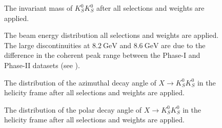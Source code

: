 \begin{figure}
  \begin{center}
    
  \end{center}
  \caption{The invariant mass of $K_S^0K_S^0$ after all selections and weights are applied.}\label{fig:meson-mass-data-pz-masscut-chisqdof-3.0-mesons-free-2}
\end{figure}
\begin{figure}
  \begin{center}
    
  \end{center}
  \caption{The beam energy distribution all selections and weights are applied. The large discontinuities at $\SI{8.2}{\giga\electronvolt}$ and $\SI{8.6}{\giga\electronvolt}$ are due to the difference in the coherent peak range between the Phase-I and Phase-II datasets (see ).}\label{fig:beam-energy-data-pz-masscut-chisqdof-3.0-mesons-free-2}
\end{figure}
\begin{figure}
  \begin{center}
    
  \end{center}
  \caption{The distribution of the azimuthal decay angle of $X \to K_S^0K_S^0$ in the helicity frame after all selections and weights are applied.}\label{fig:costheta-hx-v-meson-mass-data-pz-masscut-chisqdof-3.0-mesons-free-2}
\end{figure}
\begin{figure}
  \begin{center}
    
  \end{center}
  \caption{The distribution of the polar decay angle of $X \to K_S^0K_S^0$ in the helicity frame after all selections and weights are applied.}\label{fig:phi-hx-v-meson-mass-data-pz-masscut-chisqdof-3.0-mesons-free-2}
\end{figure}

